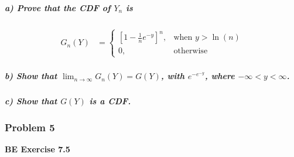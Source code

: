 \documentclass[
]{article}
\begin{document}
\hypertarget{a-prove-that-the-cdf-of-y_n-is}{%
\subparagraph{\texorpdfstring{a) Prove that the CDF of \(Y_n\)
is}{a) Prove that the CDF of Y\_n is}}\label{a-prove-that-the-cdf-of-y_n-is}}

\begin{align*}
G_n(Y) &=
\begin{cases}
  \left[ 1 - \frac{1}{n} e^{-y} \right]^n, & \text{when } y > \ln(n) \\
  0, & \text{otherwise}
\end{cases}
\end{align*}

\hypertarget{b-show-that-lim_n-to-infty-g_ny-gy-with-e-e-y-where---infty-y-infty.}{%
\subparagraph{\texorpdfstring{b) Show that
\(\lim_{n \to \infty} G_n(Y) = G(Y)\), with \(e^{-e^{-y}}\), where
\(- \infty < y < \infty\).}{b) Show that \textbackslash lim\_\{n \textbackslash to \textbackslash infty\} G\_n(Y) = G(Y), with e\^{}\{-e\^{}\{-y\}\}, where - \textbackslash infty \textless{} y \textless{} \textbackslash infty.}}\label{b-show-that-lim_n-to-infty-g_ny-gy-with-e-e-y-where---infty-y-infty.}}

\hypertarget{c-show-that-gy-is-a-cdf.}{%
\subparagraph{\texorpdfstring{c) Show that \(G(Y)\) is a
CDF.}{c) Show that G(Y) is a CDF.}}\label{c-show-that-gy-is-a-cdf.}}

\hypertarget{problem-5}{%
\subsubsection{Problem 5}\label{problem-5}}

\textbf{BE Exercise 7.5}
\end{document}
